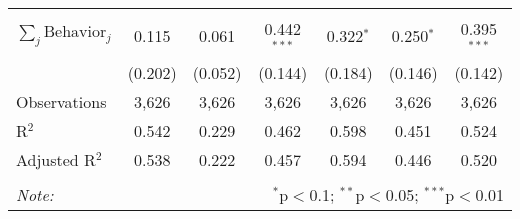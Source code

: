 \begin{tabular}{@{\extracolsep{1pt}}lcccccc}
\hline \\[-1.8ex] 
$\sum_j \mathrm{Behavior}_j$ & 0.115 & 0.061 & 0.442$^{***}$ & 0.322$^{*}$ & 0.250$^{*}$ & 0.395$^{***}$ \\ 
 & (0.202) & (0.052) & (0.144) & (0.184) & (0.146) & (0.142) \\ 
Observations & 3,626 & 3,626 & 3,626 & 3,626 & 3,626 & 3,626 \\ 
R$^{2}$ & 0.542 & 0.229 & 0.462 & 0.598 & 0.451 & 0.524 \\ 
Adjusted R$^{2}$ & 0.538 & 0.222 & 0.457 & 0.594 & 0.446 & 0.520 \\ 
\hline 
\hline \\[-1.8ex] 
\textit{Note:}  & \multicolumn{6}{r}{$^{*}$p$<$0.1; $^{**}$p$<$0.05; $^{***}$p$<$0.01} \\ 
\end{tabular} 